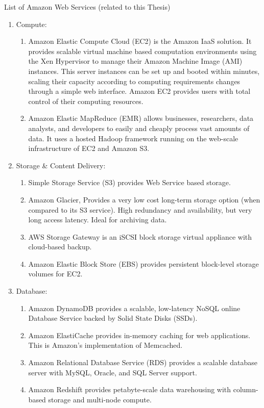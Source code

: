 \bigskip
List of Amazon Web Services (related to this Thesis) \cite{amazon:aws}
\begin{enumerate}
\item Compute:
\begin{enumerate}
   \item Amazon Elastic Compute Cloud (EC2) is the Amazon IaaS solution. It provides scalable virtual machine based computation environments using the Xen Hypervisor \cite{Xen} to manage their Amazon Machine Image (AMI) instances. This server instances can be set up and booted within minutes, scaling their capacity according to computing requirements changes through a simple web interface. Amazon EC2 provides users with total control of their computing resources. 
   \item Amazon Elastic MapReduce (EMR) allows businesses, researchers, data analysts, and developers to easily and cheaply process vast amounts of data. It uses a hosted Hadoop framework running on the web-scale infrastructure of EC2 and Amazon S3.
\end{enumerate}
\item Storage  \& Content Delivery:
\begin{enumerate}
 \item Simple Storage Service (S3) provides Web Service based storage.
\item Amazon Glacier, Provides a very low cost long-term storage option (when compared to its S3 service). High redundancy and availability, but very long access latency. Ideal for archiving data.
\item AWS Storage Gateway is an iSCSI block storage virtual appliance with cloud-based backup.
\item Amazon Elastic Block Store (EBS) provides persistent block-level storage volumes for EC2.
\end{enumerate}
\item Database:
\begin{enumerate}
\item Amazon DynamoDB provides a scalable, low-latency NoSQL online Database Service backed by Solid State Disks (SSDs).
\item Amazon ElastiCache provides in-memory caching for web applications. This is Amazon's implementation of Memcached.
 \item Amazon Relational Database Service (RDS) provides a scalable database server with MySQL, Oracle, and SQL Server support.
 \item Amazon Redshift provides petabyte-scale data warehousing with column-based storage and multi-node compute.

\end{enumerate}
\end{enumerate}
